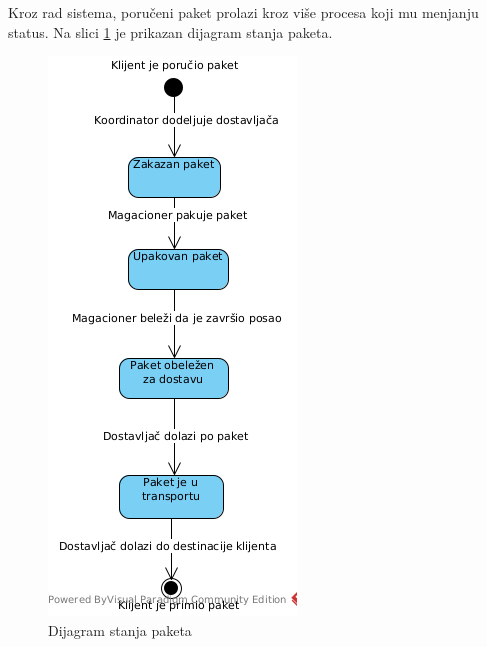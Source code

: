 Kroz rad sistema, poručeni paket prolazi kroz više procesa koji mu menjanju status. Na slici \ref{fig:StatePackage} je prikazan dijagram stanja paketa. 
\begin{figure}[H]
\begin{center}
\includegraphics[scale=0.75]{Pictures/state_package.png}
\end{center}
    \caption{Dijagram stanja paketa}
\label{fig:StatePackage}
\end{figure}







